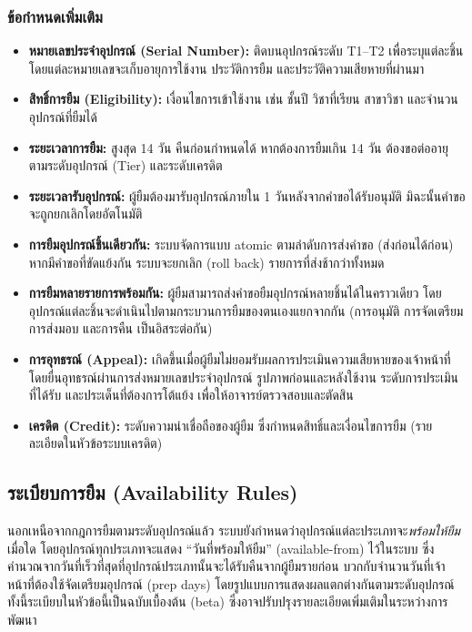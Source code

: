 \subsubsection*{ข้อกำหนดเพิ่มเติม}
\begin{itemize}
  \item \textbf{หมายเลขประจำอุปกรณ์ (Serial Number):} ติดบนอุปกรณ์ระดับ T1–T2 เพื่อระบุแต่ละชิ้น โดยแต่ละหมายเลขจะเก็บอายุการใช้งาน ประวัติการยืม และประวัติความเสียหายที่ผ่านมา
  \item \textbf{สิทธิ์การยืม (Eligibility):} เงื่อนไขการเข้าใช้งาน เช่น ชั้นปี วิชาที่เรียน สาขาวิชา และจำนวนอุปกรณ์ที่ยืมได้
  \item \textbf{ระยะเวลาการยืม:} สูงสุด 14 วัน คืนก่อนกำหนดได้ หากต้องการยืมเกิน 14 วัน ต้องขอต่ออายุตามระดับอุปกรณ์ (Tier) และระดับเครดิต
  \item \textbf{ระยะเวลารับอุปกรณ์:} ผู้ยืมต้องมารับอุปกรณ์ภายใน 1 วันหลังจากคำขอได้รับอนุมัติ มิฉะนั้นคำขอจะถูกยกเลิกโดยอัตโนมัติ
  \item \textbf{การยืมอุปกรณ์ชิ้นเดียวกัน:} ระบบจัดการแบบ atomic ตามลำดับการส่งคำขอ (ส่งก่อนได้ก่อน) หากมีคำขอที่ขัดแย้งกัน ระบบจะยกเลิก (roll back) รายการที่ส่งช้ากว่าทั้งหมด
  \item \textbf{การยืมหลายรายการพร้อมกัน:} ผู้ยืมสามารถส่งคำขอยืมอุปกรณ์หลายชิ้นได้ในคราวเดียว โดยอุปกรณ์แต่ละชิ้นจะดำเนินไปตามกระบวนการยืมของตนเองแยกจากกัน (การอนุมัติ การจัดเตรียม การส่งมอบ และการคืน เป็นอิสระต่อกัน)
  \item \textbf{การอุทธรณ์ (Appeal):} เกิดขึ้นเมื่อผู้ยืมไม่ยอมรับผลการประเมินความเสียหายของเจ้าหน้าที่ โดยยื่นอุทธรณ์ผ่านการส่งหมายเลขประจำอุปกรณ์ รูปภาพก่อนและหลังใช้งาน ระดับการประเมินที่ได้รับ และประเด็นที่ต้องการโต้แย้ง เพื่อให้อาจารย์ตรวจสอบและตัดสิน
  \item \textbf{เครดิต (Credit):} ระดับความน่าเชื่อถือของผู้ยืม ซึ่งกำหนดสิทธิ์และเงื่อนไขการยืม (รายละเอียดในหัวข้อระบบเครดิต)
\end{itemize}


\clearpage
\subsection{ระเบียบการยืม (Availability Rules)}

\hspace*{2em}นอกเหนือจากกฎการยืมตามระดับอุปกรณ์แล้ว ระบบยังกำหนดว่าอุปกรณ์แต่ละประเภทจะ\emph{พร้อมให้ยืม}เมื่อใด โดยอุปกรณ์ทุกประเภทจะแสดง ``วันที่พร้อมให้ยืม'' (available-from) ไว้ในระบบ ซึ่งคำนวณจากวันที่เร็วที่สุดที่อุปกรณ์ประเภทนั้นจะได้รับคืนจากผู้ยืมรายก่อน บวกกับจำนวนวันที่เจ้าหน้าที่ต้องใช้จัดเตรียมอุปกรณ์ (prep days) โดยรูปแบบการแสดงผลแตกต่างกันตามระดับอุปกรณ์ ทั้งนี้ระเบียบในหัวข้อนี้เป็นฉบับเบื้องต้น (beta) ซึ่งอาจปรับปรุงรายละเอียดเพิ่มเติมในระหว่างการพัฒนา

